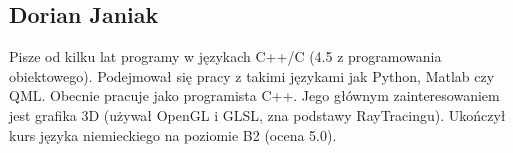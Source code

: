 ﻿\subsection{Dorian Janiak}
Pisze od kilku lat programy w językach C++/C (4.5 z programowania obiektowego).
Podejmował się pracy z takimi językami jak Python, Matlab czy QML.
Obecnie pracuje jako programista C++. 
Jego głównym zainteresowaniem jest grafika 3D (używał OpenGL i GLSL, zna podstawy RayTracingu).
Ukończył kurs języka niemieckiego na poziomie B2 (ocena 5.0).
